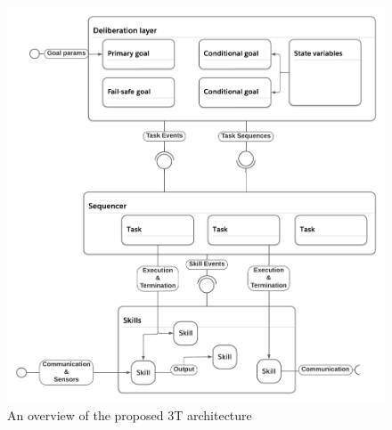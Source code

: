 \documentclass[main.tex]{subfiles}
\begin{document}
\begin{figure}[htbp]
    \centering
    \includegraphics[width=\textwidth]{architecture-proposal.png}
    \caption{An overview of the proposed 3T architecture}
    \label{arch-proposal}
\end{figure}

\end{document}
